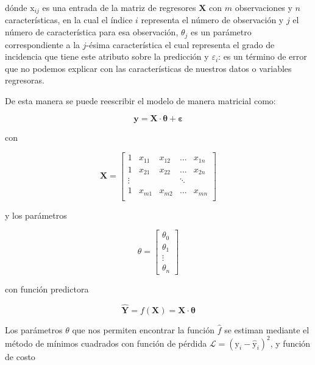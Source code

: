         dónde $\mathrm{x}_{i j}$ es una entrada de la matriz de regresores $\mathbf{X}$ con $m$ observaciones y $n$ características, en la cual el índice $i$ representa el número de observación y $j$ el número de característica para esa observación, $\theta_j$ es un parámetro correspondiente a la $j$-ésima característica el cual representa el grado de incidencia que tiene este atributo sobre la predicción y $\varepsilon_i$: es un término de error que no podemos explicar con las características de nuestros datos o variables regresoras.
        
        \noindent De esta manera se puede reescribir el modelo de manera matricial como:
        
        \begin{equation}
            \mathbf{y} = \mathbf{X}\cdot\mathbf{\theta} + \mathbf{\varepsilon}\label{eq:3}
        \end{equation}
        
        \noindent con
        
        $$\mathbf{X} = \begin{bmatrix}
                        1 & x_{11} & x_{12} & \dots & x_{1n}\\
                        1 & x_{21} & x_{22} & \dots & x_{2n}\\
                        \vdots & & & \ddots & \\
                        1 & x_{m1} & x_{m2} & \dots & x_{mn}\\
                        \end{bmatrix}$$
        
        \noindent y los parámetros
        
        $$\theta = \begin{bmatrix}
                    \theta_0\\
                    \theta_1\\
                    \vdots\\
                    \theta_n
                    \end{bmatrix}$$
                    
        \noindent con función predictora
        
        \begin{equation}
            \mathbf{\hat{Y}} = f(\mathbf{X}) = \mathbf{X}\cdot\mathbf{\theta}
        \end{equation}
        
        Los parámetros $\theta$ que nos permiten encontrar la función $\hat{f}$ se estiman mediante el método de mínimos cuadrados con función de pérdida $\mathcal{L} =  (\mathrm{y}_i - \mathrm{\hat{y}}_i)^2$, y función de costo
        
